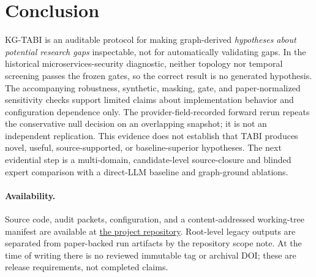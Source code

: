 \documentclass[runningheads]{llncs}
\begin{document}
\section{Conclusion}
KG-TABI is an auditable protocol for making graph-derived \emph{hypotheses about potential research gaps} inspectable, not for automatically validating gaps. In the historical microservices-security diagnostic, neither topology nor temporal screening passes the frozen gates, so the correct result is no generated hypothesis. The accompanying robustness, synthetic, masking, gate, and paper-normalized sensitivity checks support limited claims about implementation behavior and configuration dependence only. The provider-field-recorded forward rerun repeats the conservative null decision on an overlapping snapshot; it is not an independent replication. This evidence does not establish that TABI produces novel, useful, source-supported, or baseline-superior hypotheses. The next evidential step is a multi-domain, candidate-level source-closure and blinded expert comparison with a direct-LLM baseline and graph-ground ablations.

\paragraph{Availability.} Source code, audit packets, configuration, and a content-addressed working-tree manifest are available at \href{https://github.com/Khoa-Hoa-Technology-Solution-Company/research-paper-gap}{the project repository}. Root-level legacy outputs are separated from paper-backed run artifacts by the repository scope note. At the time of writing there is no reviewed immutable tag or archival DOI; these are release requirements, not completed claims.



\end{document}
